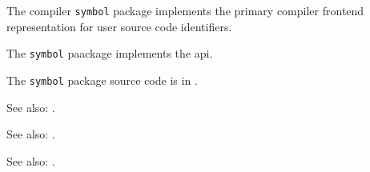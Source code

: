 
The compiler {\tt symbol} package implements the primary compiler frontend 
representation for user source code identifiers.

The {\tt symbol} paackage implements the  api.

The {\tt symbol} package source code is in .

See also:  .

See also:  .

See also:  .